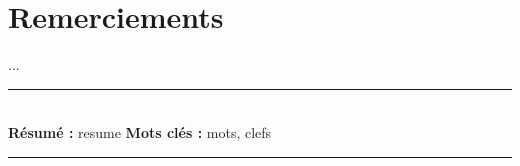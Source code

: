 \documentclass[a4paper,11pt,twoside]{StyleThese}
\begin{document}


    \makeflyleaf


\dominitoc


 \cleardoublepage

\section*{Remerciements}

...

\tableofcontents

\mainmatter












\appendix




%



\cleardoublepage
\begin{vcenterpage}
\noindent\rule[2pt]{\textwidth}{0.5pt}
\\
{\large\textbf{Résumé :}}
resume
{\large\textbf{Mots clés :}}
mots, clefs
\\
\noindent\rule[2pt]{\textwidth}{0.5pt}
\end{vcenterpage}
\end{document}
